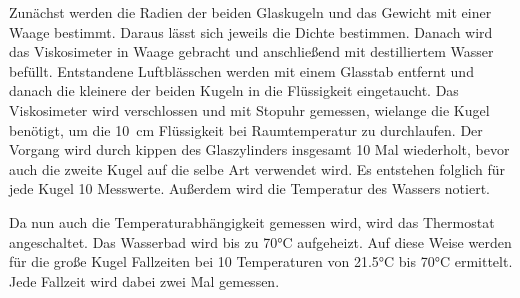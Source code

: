Zunächst werden die Radien der beiden Glaskugeln und das Gewicht mit einer 
Waage bestimmt. Daraus lässt sich jeweils die Dichte bestimmen. 
Danach wird das Viskosimeter in Waage gebracht und anschließend mit destilliertem Wasser 
befüllt. Entstandene Luftblässchen werden mit einem Glasstab entfernt und 
danach die kleinere der beiden Kugeln in die Flüssigkeit eingetaucht. Das 
Viskosimeter wird verschlossen und mit Stopuhr gemessen, wielange die Kugel benötigt, 
um die \SI{10}{\centi\meter} Flüssigkeit bei Raumtemperatur zu durchlaufen. 
Der Vorgang wird durch kippen des Glaszylinders insgesamt 10 Mal wiederholt, 
bevor auch die zweite Kugel auf die selbe Art verwendet wird. Es entstehen 
folglich für jede Kugel 10 Messwerte. Außerdem wird die Temperatur des Wassers
notiert. 

Da nun auch die Temperaturabhängigkeit gemessen wird, wird das Thermostat
angeschaltet. Das Wasserbad wird bis zu 70°C aufgeheizt. 
Auf diese Weise werden für die große Kugel Fallzeiten bei 10 
Temperaturen von 21.5°C bis 70°C ermittelt.
Jede Fallzeit wird dabei zwei Mal gemessen. 


\label{sec:Durchführung}

